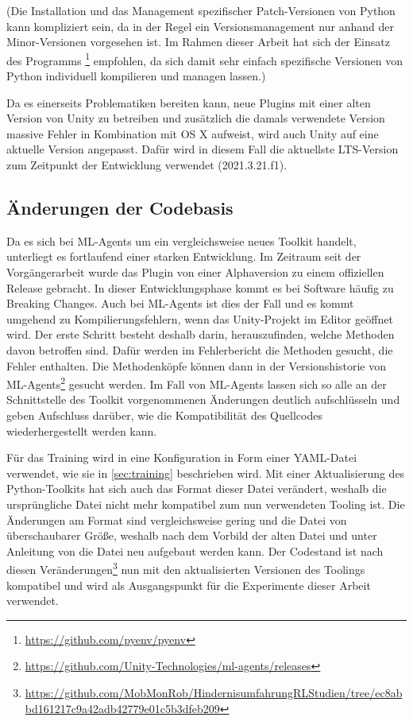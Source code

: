 (Die Installation und das Management spezifischer Patch-Versionen von Python kann kompliziert sein, da in der Regel ein Versionsmanagement nur anhand der Minor-Versionen vorgesehen ist.
Im Rahmen dieser Arbeit hat sich der Einsatz des Programms \footnote{\url{https://github.com/pyenv/pyenv}} empfohlen, da sich damit sehr einfach spezifische Versionen von Python individuell kompilieren und managen lassen.)

Da es einerseits Problematiken bereiten kann, neue Plugins mit einer alten Version von Unity zu betreiben und zusätzlich die damals verwendete Version massive Fehler in Kombination mit OS X aufweist, wird auch Unity auf eine aktuelle Version angepasst.
Dafür wird in diesem Fall die aktuellste LTS-Version zum Zeitpunkt der Entwicklung verwendet (2021.3.21.f1).

\subsection{Änderungen der Codebasis}
Da es sich bei ML-Agents um ein vergleichsweise neues Toolkit handelt, unterliegt es fortlaufend einer starken Entwicklung.
Im Zeitraum seit der Vorgängerarbeit wurde das Plugin von einer Alphaversion zu einem offiziellen Release gebracht.
In dieser Entwicklungsphase kommt es bei Software häufig zu Breaking Changes.
Auch bei ML-Agents ist dies der Fall und es kommt umgehend zu Kompilierungsfehlern, wenn das Unity-Projekt im Editor geöffnet wird.
Der erste Schritt besteht deshalb darin, herauszufinden, welche Methoden davon betroffen sind.
Dafür werden im Fehlerbericht die Methoden gesucht, die Fehler enthalten.
Die Methodenköpfe können dann in der Versionshistorie von ML-Agents\footnote{\url{https://github.com/Unity-Technologies/ml-agents/releases}} gesucht werden.
Im Fall von ML-Agents lassen sich so alle an der Schnittstelle des Toolkit vorgenommenen Änderungen deutlich aufschlüsseln und geben Aufschluss darüber, wie die Kompatibilität des Quellcodes wiederhergestellt werden kann.

Für das Training wird in \cite{waidner.2020} eine Konfiguration in Form einer YAML-Datei verwendet, wie sie in \autoref{sec:training} beschrieben wird.
Mit einer Aktualisierung des Python-Toolkits hat sich auch das Format dieser Datei verändert, weshalb die ursprüngliche Datei nicht mehr kompatibel zum nun verwendeten Tooling ist.
Die Änderungen am Format sind vergleichsweise gering und die Datei von überschaubarer Größe, weshalb nach dem Vorbild der alten Datei und unter Anleitung von \cite{mlagentsHyperparameter} die Datei neu aufgebaut werden kann.
Der Codestand ist nach diesen Veränderungen\footnote{\url{https://github.com/MobMonRob/HindernisumfahrungRLStudien/tree/ec8abbd161217c9a42adb42779e01c5b3dfeb209}} nun mit den aktualisierten Versionen des Toolings kompatibel und wird als Ausgangspunkt für die Experimente dieser Arbeit verwendet.


